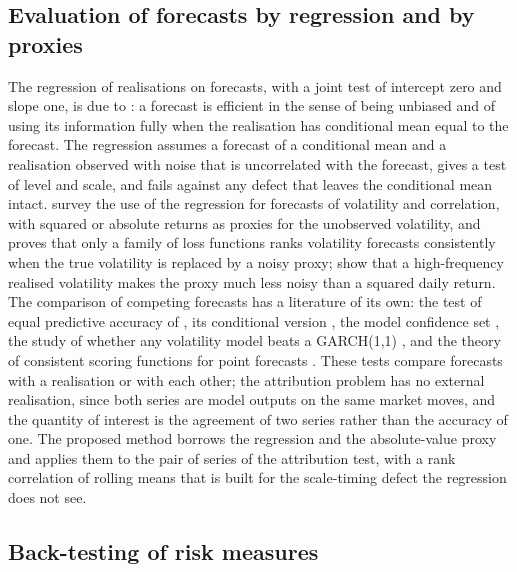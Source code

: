 \subsection{Evaluation of forecasts by regression and by proxies}
\label{sec:rw-forecast}

The regression of realisations on forecasts, with a joint test of intercept zero and slope one, is due to \citet{mincer1969}: a forecast is efficient in the sense of being unbiased and of using its information fully when the realisation has conditional mean equal to the forecast.
The regression assumes a forecast of a conditional mean and a realisation observed with noise that is uncorrelated with the forecast, gives a test of level and scale, and fails against any defect that leaves the conditional mean intact.
\citet{patton2009} survey the use of the regression for forecasts of volatility and correlation, with squared or absolute returns as proxies for the unobserved volatility, and \citet{patton2011} proves that only a family of loss functions ranks volatility forecasts consistently when the true volatility is replaced by a noisy proxy; \citet{andersen1998} show that a high-frequency realised volatility makes the proxy much less noisy than a squared daily return.
The comparison of competing forecasts has a literature of its own: the test of equal predictive accuracy of \citet{diebold1995}, its conditional version \citep{giacomini2006}, the model confidence set \citep{hansen2011}, the study of whether any volatility model beats a GARCH(1,1) \citep{hansen2005}, and the theory of consistent scoring functions for point forecasts \citep{gneiting2011}.
These tests compare forecasts with a realisation or with each other; the attribution problem has no external realisation, since both series are model outputs on the same market moves, and the quantity of interest is the agreement of two series rather than the accuracy of one.
The proposed method borrows the regression and the absolute-value proxy and applies them to the pair of series of the attribution test, with a rank correlation of rolling means that is built for the scale-timing defect the regression does not see.

\subsection{Back-testing of risk measures}
\label{sec:rw-backtest}

